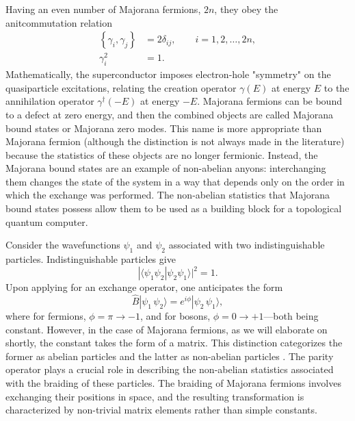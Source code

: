 \documentclass{article}
\begin{document}
Having an even number of Majorana fermions, $ 2n $, they obey the anitcommutation relation
\begin{equation}
	\begin{aligned}
		\left\{\gamma_i, \gamma_j\right\} & = 2 \delta_{i j}, \qquad i=1, 2, \dots, 2n  , \\
		\gamma_i^2                        & = 1.
	\end{aligned}
\end{equation}
Mathematically, the superconductor imposes electron-hole "symmetry" on the quasiparticle excitations, relating the creation operator $\gamma(E)$ at energy $E$ to the annihilation operator $\gamma^{\dagger}(-E)$ at energy $-E$.\cite{Majorana-returns} Majorana fermions can be bound to a defect at zero energy, and then the combined objects are called Majorana bound states or Majorana zero modes. This name is more appropriate than Majorana fermion (although the distinction is not always made in the literature) because the statistics of these objects are no longer fermionic. Instead, the Majorana bound states are an example of non-abelian anyons: interchanging them changes the state of the system in a way that depends only on the order in which the exchange was performed. The non-abelian statistics that Majorana bound states possess allow them to be used as a building block for a topological quantum computer.

Consider the wavefunctions $ \psi_1 $ and $ \psi_2 $ associated with two indistinguishable particles. Indistinguishable particles give
\[
	| \langle \psi_1 \psi_2 | \psi_2 \psi_1 \rangle |^2 = 1 .
\]
Upon applying for an exchange operator, one anticipates the form
\begin{equation}
	\hat{B} | \psi_1\, \psi_2 \rangle = e^{i\phi} | \psi_2\, \psi_1 \rangle,
\end{equation}
where for fermions, $ \phi = \pi \rightarrow -1 $, and for bosons, $ \phi = 0 \rightarrow +1 $—both being constant. However, in the case of Majorana fermions, as we will elaborate on shortly, the constant takes the form of a matrix. This distinction categorizes the former as abelian particles and the latter as non-abelian particles \cite{Nayak_2008}. The parity operator plays a crucial role in describing the non-abelian statistics associated with the braiding of these particles. The braiding of Majorana fermions involves exchanging their positions in space, and the resulting transformation is characterized by non-trivial matrix elements rather than simple constants.
\end{document}
